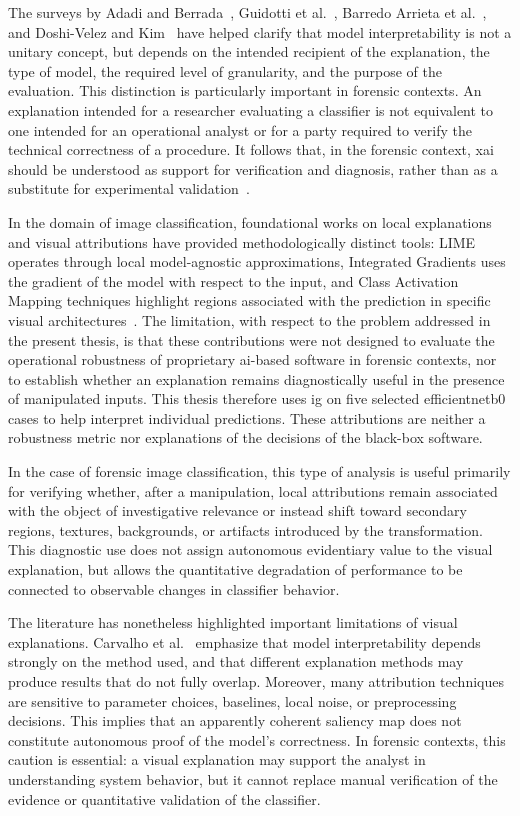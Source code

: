 The surveys by Adadi and Berrada~\cite{Adadi2018}, Guidotti et
al.~\cite{Guidotti2019}, Barredo Arrieta et al.~\cite{Barredo2018}, and
Doshi-Velez and Kim~\cite{Doshi-Velez2017} have helped clarify that model
interpretability is not a unitary concept, but depends on the intended
recipient of the explanation, the type of model, the required level of
granularity, and the purpose of the evaluation. This distinction is
particularly important in forensic contexts. An explanation intended for a
researcher evaluating a classifier is not equivalent to one intended for an
operational analyst or for a party required to verify the technical correctness
of a procedure. It follows that, in the forensic context, \gls{xai} should be
understood as support for verification and diagnosis, rather than as a
substitute for experimental
validation~\cite{Adadi2018,Doshi-Velez2017,sanna2025cybercrime}.

In the domain of image classification, foundational works on local explanations
and visual attributions have provided methodologically distinct tools: LIME
operates through local model-agnostic approximations, Integrated Gradients uses
the gradient of the model with respect to the input, and Class Activation
Mapping techniques highlight regions associated with the prediction in specific
visual architectures~\cite{Ribeiro2016,Sundararajan2017,Zhou2016}. The
limitation, with respect to the problem addressed in the present thesis, is
that these contributions were not designed to evaluate the operational
robustness of proprietary \gls{ai}-based software in forensic contexts, nor to
establish whether an explanation remains diagnostically useful in the presence
of manipulated inputs. This thesis therefore uses \gls{ig} on five selected
\gls{efficientnetb0} cases to help interpret individual predictions. These
attributions are neither a robustness metric nor explanations of the decisions
of the black-box software.

In the case of forensic image classification, this type of analysis is useful
primarily for verifying whether, after a manipulation, local attributions remain
associated with the object of investigative relevance or instead shift toward
secondary regions, textures, backgrounds, or artifacts introduced by the
transformation. This diagnostic use does not assign autonomous evidentiary
value to the visual explanation, but allows the quantitative degradation of
performance to be connected to observable changes in classifier behavior.

The literature has nonetheless highlighted important limitations of visual
explanations. Carvalho et al.~\cite{Carvalho2019} emphasize that model
interpretability depends strongly on the method used, and that different
explanation methods may produce results that do not fully overlap. Moreover,
many attribution techniques are sensitive to parameter choices, baselines, local
noise, or preprocessing decisions. This implies that an apparently coherent
saliency map does not constitute autonomous proof of the model's correctness.
In forensic contexts, this caution is essential: a visual explanation may
support the analyst in understanding system behavior, but it cannot replace
manual verification of the evidence or quantitative validation of the
classifier.

